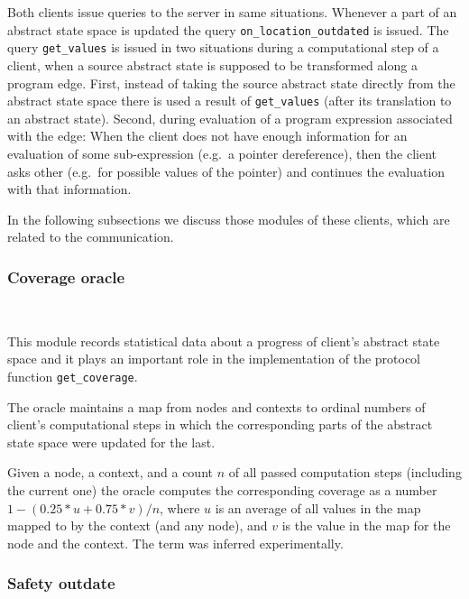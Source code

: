 \documentclass[envcountsame]{llncs}
\begin{document}
Both clients issue queries to the server in same situations. Whenever a part of
an abstract state space is updated the query \texttt{on\_location\_outdated} is
issued. The query \texttt{get\_values} is issued in two situations during a
computational step of a client, when a source abstract state is supposed to be
transformed along a program edge. First, instead of taking the source abstract
state directly from the abstract state space there is used a result of
\texttt{get\_values} (after its translation to an abstract state). Second,
during evaluation of a program expression associated with the edge: When the
client does not have enough information for an evaluation of some sub-expression
(e.g.~a pointer dereference), then the client asks other (e.g.~for possible
values of the pointer) and continues the evaluation with that information.

In the following subsections we discuss those modules of these clients, which
are related to the communication.

\subsubsection{Coverage oracle}~\\
\label{sec:CoverageSracleBoxPolka}

This module records statistical data about a progress of client's abstract state
space and it plays an important role in the implementation of the protocol
function \texttt{get\_coverage}.

The oracle maintains a map from nodes and contexts to ordinal numbers of
client's computational steps in which the corresponding parts of the abstract
state space were updated for the last.

Given a node, a context, and a count $ n $ of all passed computation steps
(including the current one) the oracle computes the corresponding coverage as a
number $ 1 - (0.25 * u + 0.75 * v) / n $, where $ u $ is an average of all
values in the map mapped to by the context (and any node), and $ v $ is the
value in the map for the node and the context. The term was inferred
experimentally.

\subsubsection{Safety outdate}~\\
\label{sec:SafetyOutdateBoxPolka}
\end{document}
